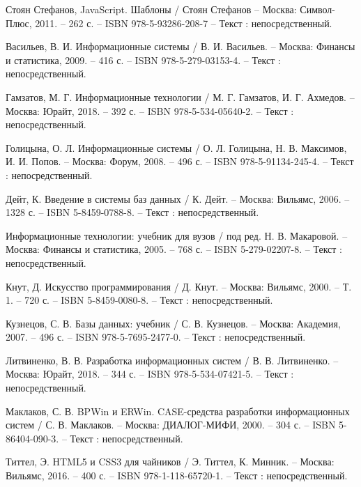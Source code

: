 
\begin{thebibliography}{9}

    Стоян Стефанов, JavaScript. Шаблоны / Стоян Стефанов – Москва: Символ-Плюс, 2011. – 262 с. – ISBN 978-5-93286-208-7 – Текст : непосредственный.
    
    Васильев, В. И. Информационные системы / В. И. Васильев. – Москва: Финансы и статистика, 2009. – 416 с. – ISBN 978-5-279-03153-4. – Текст : непосредственный.
    
    Гамзатов, М. Г. Информационные технологии / М. Г. Гамзатов, И. Г. Ахмедов. – Москва: Юрайт, 2018. – 392 с. – ISBN 978-5-534-05640-2. – Текст : непосредственный.
    
    Голицына, О. Л. Информационные системы / О. Л. Голицына, Н. В. Максимов, И. И. Попов. – Москва: Форум, 2008. – 496 с. – ISBN 978-5-91134-245-4. – Текст : непосредственный.
    
    Дейт, К. Введение в системы баз данных / К. Дейт. – Москва: Вильямс, 2006. – 1328 с. – ISBN 5-8459-0788-8. – Текст : непосредственный.
    
    Информационные технологии: учебник для вузов / под ред. Н. В. Макаровой. – Москва: Финансы и статистика, 2005. – 768 с. – ISBN 5-279-02207-8. – Текст : непосредственный.
    
    Кнут, Д. Искусство программирования / Д. Кнут. – Москва: Вильямс, 2000. – Т. 1. – 720 с. – ISBN 5-8459-0080-8. – Текст : непосредственный.
    
    Кузнецов, С. В. Базы данных: учебник / С. В. Кузнецов. – Москва: Академия, 2007. – 496 с. – ISBN 978-5-7695-2477-0. – Текст : непосредственный.
    
    Литвиненко, В. В. Разработка информационных систем / В. В. Литвиненко. – Москва: Юрайт, 2018. – 344 с. – ISBN 978-5-534-07421-5. – Текст : непосредственный.
    
    Маклаков, С. В. BPWin и ERWin. CASE-средства разработки информационных систем / С. В. Маклаков. – Москва: ДИАЛОГ-МИФИ, 2000. – 304 с. – ISBN 5-86404-090-3. – Текст : непосредственный.
    
    Титтел, Э. HTML5 и CSS3 для чайников / Э. Титтел, К. Минник. – Москва: Вильямс, 2016. – 400 с. – ISBN 978-1-118-65720-1. – Текст : непосредственный.
    

\end{thebibliography}
